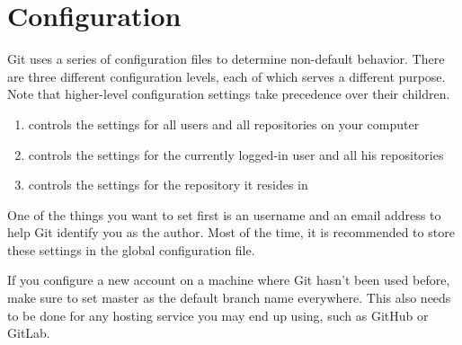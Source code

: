 \section{Configuration}\label{configuation}

\begin{flushleft}
	Git uses a series of configuration files to determine non-default behavior. There
	are three different configuration levels, each of which serves a different purpose.
	Note that higher-level configuration settings take precedence over their children.
\end{flushleft}

\begin{enumerate}
	\item {} controls the settings for all users and all repositories on your computer
	\item {} controls the settings for the currently logged-in user and all his repositories
	\item {} controls the settings for the repository it resides in
\end{enumerate}

\begin{flushleft}
	One of the things you want to set first is an username and an email address
	to help Git identify you as the author. Most of the time, it is recommended
	to store these settings in the global configuration file.
\end{flushleft}

\begin{flushleft}
\end{flushleft}
\vspace{-0.6cm}
\begin{flushleft}
\end{flushleft}

\begin{flushleft}
	If you configure a new account on a machine where Git hasn't been used before,
	make sure to set master as the default branch name everywhere. This also needs
	to be done for any hosting service you may end up using, such as GitHub or GitLab.
\end{flushleft}

\begin{flushleft}
\end{flushleft}

